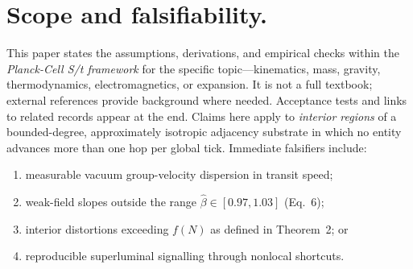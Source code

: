\section*{Scope and falsifiability.}
This paper states the assumptions, derivations, and empirical checks within the \emph{Planck-Cell S/t framework} for the specific topic---kinematics, mass, gravity, thermodynamics, electromagnetics, or expansion. It is not a full textbook; external references provide background where needed. Acceptance tests and links to related records appear at the end. Claims here apply to \emph{interior regions} of a bounded-degree, approximately isotropic adjacency substrate in which no entity advances more than one hop per global tick. Immediate falsifiers include:
\begin{enumerate}[label=(\roman*)]
  \item measurable vacuum group-velocity dispersion in transit speed;
  \item weak-field slopes outside the range $\hat{\beta} \in [0.97, 1.03]$ (Eq.~6);
  \item interior distortions exceeding $f(N)$ as defined in Theorem~2; or
  \item reproducible superluminal signalling through nonlocal shortcuts.
\end{enumerate}
